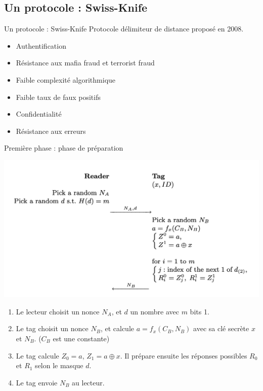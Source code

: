 \documentclass[aspectratio=169]{beamer}
\begin{document}
\subsection{Un protocole : Swiss-Knife}

\begin{frame}{Un protocole : Swiss-Knife}
  Protocole délimiteur de distance proposé en 2008. \cite{SwissKnife}

  \bigskip

  \begin{itemize}
    \item Authentification
    \item Résistance aux mafia fraud et terrorist fraud
    \item Faible complexité algorithmique
    \item Faible taux de faux positifs
    \item Confidentialité
    \item Résistance aux erreurs
  \end{itemize}

\end{frame}


\begin{frame}{Première phase : phase de préparation}
  \begin{multicols}{2}
    \begin{minipage}[c]{\linewidth}
      \centering
      \bigskip
      \medskip
      \includegraphics[width=\linewidth]{../assets/sk-phase1.png}
    \end{minipage}

    \begin{minipage}[t]{\linewidth}
      \begin{enumerate}
        \item Le lecteur choisit un nonce $N_A$, et $d$ un nombre avec $m$ bits 1.
        \item Le tag choisit un nonce $N_B$, et calcule $a = f_x(C_B, N_B)$ avec sa clé secrète $x$ et $N_B$. ($C_B$ est une constante)
        \item Le tag calcule $Z_0 = a$, $Z_1 = a \oplus x$. Il prépare ensuite les réponses possibles $R_0$ et $R_1$ selon le masque $d$.
        \item Le tag envoie $N_B$ au lecteur.
      \end{enumerate}
    \end{minipage}
  \end{multicols}
\end{frame}
\end{document}
